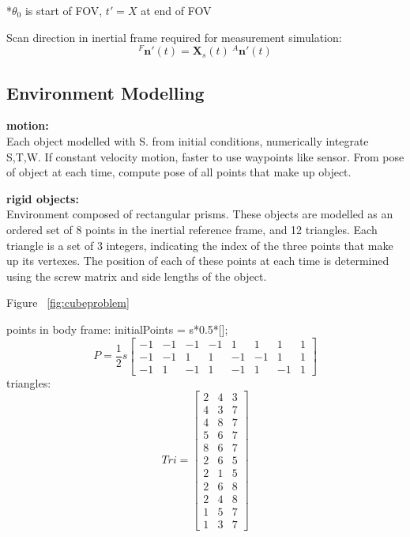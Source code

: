 *$\theta_0$ is start of FOV, $t'=X$ at end of FOV

Scan direction in inertial frame required for measurement simulation:
\begin{equation}
	{^{F}\mathbf{n'}(t)} = \mathbf{X}_s(t)\:{^{A}\mathbf{n'}(t)}
\end{equation}

\subsection{Environment Modelling}

\textbf{motion:}\\
Each object modelled with S. from initial conditions, numerically integrate S,T,W. If constant velocity motion, faster to use waypoints like sensor.
From pose of object at each time, compute pose of all points that make up object.

\textbf{rigid objects:}\\
Environment composed of rectangular prisms. These objects are modelled as an ordered set of 8 points in the inertial reference frame, and 12 triangles. Each triangle is a set of 3 integers, indicating the index of the three points that make up its vertexes.
The position of each of these points at each time is determined using the screw matrix and side lengths of the object.

Figure ~\ref{fig:cubeproblem}


points in body frame:
initialPoints = s*0.5*[];
\begin{equation}
	P = \frac{1}{2}s
	\begin{bmatrix}
		-1  &  -1  &  -1  &  -1  &   1  &   1  &   1  &  1 \\
		-1  &  -1  &   1  &   1  &  -1  &  -1  &   1  &  1 \\
		-1  &   1  &  -1  &   1  &  -1  &   1  &  -1  &  1 
	\end{bmatrix}
\end{equation}
triangles:
\begin{equation}
	Tri = 
	\begin{bmatrix}
	2 & 4 & 3 \\
    4 & 3 & 7 \\
    4 & 8 & 7 \\
    5 & 6 & 7 \\
    8 & 6 & 7 \\
    2 & 6 & 5 \\
    2 & 1 & 5 \\
    2 & 6 & 8 \\
    2 & 4 & 8 \\
    1 & 5 & 7 \\
    1 & 3 & 7
	\end{bmatrix}
\end{equation}


